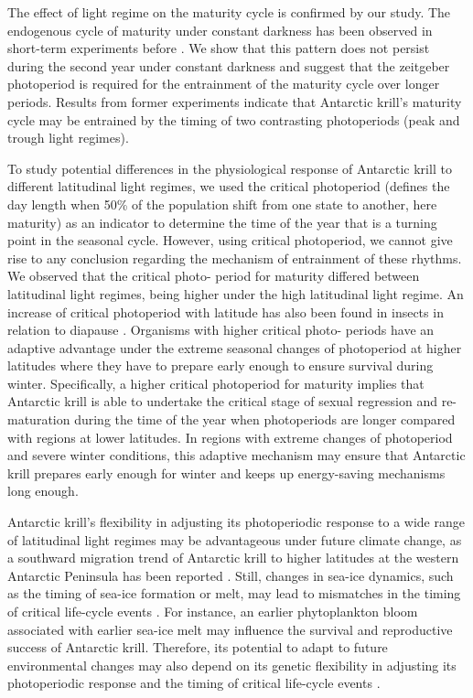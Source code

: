 The effect of light regime on the maturity cycle \citep{hirano_antarctic_2003,
teschke_effects_2008, brown_flexible_2011} is confirmed by our study. The
endogenous cycle of maturity under constant darkness has been observed in
short-term experiments before \citep{thomas_thelycum_1987,
kawaguchi_learning_2007, brown_flexible_2011}. We show that this pattern does
not persist during the second year under constant darkness and suggest that the
zeitgeber photoperiod is required for the entrainment of the maturity cycle
over longer periods. Results from former experiments
\citep{hirano_antarctic_2003, brown_flexible_2011} indicate that Antarctic
krill’s maturity cycle may be entrained by the timing of two contrasting
photoperiods (peak and trough light regimes). 

To study potential differences in the physiological response of Antarctic krill
to different latitudinal light regimes, we used the critical photoperiod
(defines the day length when 50\% of the population shift from one state to
another, here maturity) as an indicator to determine the time of the year that
is a turning point in the seasonal cycle. However, using critical photoperiod,
we cannot give rise to any conclusion regarding the mechanism of entrainment of
these rhythms. We observed that the critical photo- period for maturity
differed between latitudinal light regimes, being higher under the high
latitudinal light regime. An increase of critical photoperiod with latitude has
also been found in insects in relation to diapause
\citep{bradshaw_evolution_2007, tyukmaeva_adaptation_2011,
hut_latitudinal_2013}. Organisms with higher critical photo- periods have an
adaptive advantage under the extreme seasonal changes of photoperiod at higher
latitudes where they have to prepare early enough to ensure survival during
winter. Specifically, a higher critical photoperiod for maturity implies that
Antarctic krill is able to undertake the critical stage of sexual regression
and re-maturation during the time of the year when photoperiods are longer
compared with regions at lower latitudes. In regions with extreme changes of
photoperiod and severe winter conditions, this adaptive mechanism may ensure
that Antarctic krill prepares early enough for winter and keeps up
energy-saving mechanisms long enough. 

Antarctic krill’s flexibility in adjusting its photoperiodic response to a wide
range of latitudinal light regimes may be advantageous under future climate
change, as a southward migration trend of Antarctic krill to higher latitudes
at the western Antarctic Peninsula has been reported \citep{ross_trends_2014}.
Still, changes in sea-ice dynamics, such as the timing of sea-ice formation or
melt, may lead to mismatches in the timing of critical life-cycle events
\citep{clarke_climate_2007}. For instance, an earlier phytoplankton bloom
associated with earlier sea-ice melt may influence the survival and
reproductive success of Antarctic krill. Therefore, its potential to adapt to
future environmental changes may also depend on its genetic flexibility in
adjusting its photoperiodic response and the timing of critical life-cycle
events \citep{bradshaw_evolution_2007}.

